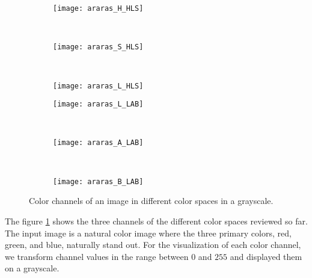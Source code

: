 \begin{figure}[!ht]
    \begin{subfigure}[t]{\textwidth+20pt\relax}
    	\texttt{[image: araras\_H\_HLS]}
    \end{subfigure}     
    ~ %
    \begin{subfigure}[b]{0.3\textwidth}
        \texttt{[image: araras\_S\_HLS]}
    \end{subfigure}
    ~ %
    \begin{subfigure}[b]{0.3\textwidth}
        \texttt{[image: araras\_L\_HLS]}
    \end{subfigure} \vspace{5pt} 
        
    \begin{subfigure}[t]{\textwidth+20pt\relax}
    	\texttt{[image: araras\_L\_LAB]}
    \end{subfigure}    
    ~ %
    \begin{subfigure}[b]{0.3\textwidth}
        \texttt{[image: araras\_A\_LAB]}
    \end{subfigure}
    ~ %
    \begin{subfigure}[b]{0.3\textwidth}
        \texttt{[image: araras\_B\_LAB]}
    \end{subfigure} 

	\caption{Color channels of an image in different color spaces in a grayscale.}\label{fig:images_color_space}    
\end{figure}


The figure \ref{fig:images_color_space} shows the three channels of the different color spaces reviewed so far. The input image is a natural color image where the three primary colors, red, green, and blue, naturally stand out. For the visualization of each color channel, we transform channel values in the range between $0$ and $255$ and displayed them on a grayscale. 


